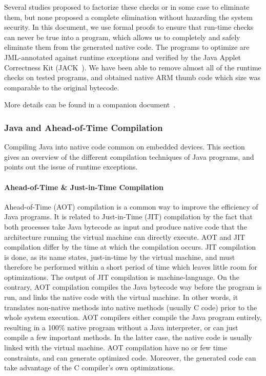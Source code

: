 Several studies proposed to factorize these checks or in some case to eliminate them, but none proposed a complete elimination without hazarding the system security. In this document, we use formal proofs to ensure that run-time checks can never be true into a program, which allows us to completely and safely eliminate them from the generated native code. The programs to optimize are JML-annotated against runtime exceptions and verified by the Java Applet Correctness Kit (JACK~\cite{BRL-JACK}). We have been able to remove almost all of the runtime checks on tested programs, and obtained native ARM thumb code which size was comparable to the original bytecode. 

More details can be found in a companion document~\cite{mariela06:cardis}.

\subsubsection{Java and Ahead-of-Time Compilation}
\label{sec:sota}

Compiling Java into native code common on embedded devices. This section gives an overview of the different compilation techniques of Java programs, and points out the issue of runtime exceptions.

\paragraph{Ahead-of-Time \& Just-in-Time Compilation}

Ahead-of-Time (AOT) compilation is a common way to improve the efficiency of Java programs. It is related to Just-in-Time (JIT) compilation by the fact that both processes take Java bytecode as input and produce native code that the architecture running the virtual machine can directly execute. AOT and JIT compilation differ by the time at which the compilation occurs. JIT compilation is done, as its name states, just-in-time by the virtual machine, and must therefore be performed within a short period of time which leaves little room for optimizations. The output of JIT compilation is machine-language. On the contrary, AOT compilation compiles the Java bytecode way before the program is run, and links the native code with the virtual machine. In other words, it translates non-native methods into native methods (usually C code) prior to the whole system execution. AOT compilers either compile the Java program entirely, resulting in a 100\% native program without a Java interpreter, or can just compile a few important methods. In the latter case, the native code is usually linked with the virtual machine. AOT compilation have no or few time constraints, and can generate optimized code. Moreover, the generated code can take advantage of the C compiler's own optimizations.

